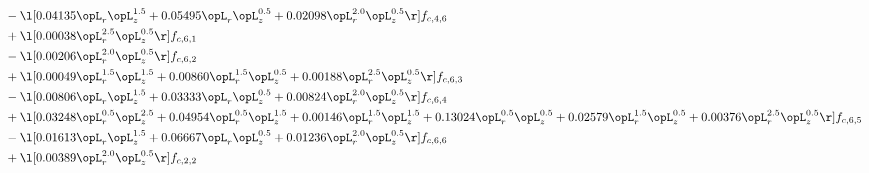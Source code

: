 \begin{alignat}{2}
& - \l[  0.04135 \opL_r \opL_z^{1.5} +  0.05495 \opL_r \opL_z^{0.5} +  0.02098 \opL_r^{2.0} \opL_z^{0.5}  \r] f_{c,4,6} \nonumber \\ 
& + \l[  0.00038 \opL_r^{2.5} \opL_z^{0.5}  \r] f_{c,6,1} \nonumber \\ 
& - \l[  0.00206 \opL_r^{2.0} \opL_z^{0.5}  \r] f_{c,6,2} \nonumber \\ 
& + \l[  0.00049 \opL_r^{1.5} \opL_z^{1.5} +  0.00860 \opL_r^{1.5} \opL_z^{0.5} +  0.00188 \opL_r^{2.5} \opL_z^{0.5}  \r] f_{c,6,3} \nonumber \\ 
& - \l[  0.00806 \opL_r \opL_z^{1.5} +  0.03333 \opL_r \opL_z^{0.5} +  0.00824 \opL_r^{2.0} \opL_z^{0.5}  \r] f_{c,6,4} \nonumber \\ 
& + \l[  0.03248 \opL_r^{0.5} \opL_z^{2.5} +  0.04954 \opL_r^{0.5} \opL_z^{1.5} +  0.00146 \opL_r^{1.5} \opL_z^{1.5} +  0.13024 \opL_r^{0.5} \opL_z^{0.5} +  0.02579 \opL_r^{1.5} \opL_z^{0.5} +  0.00376 \opL_r^{2.5} \opL_z^{0.5}  \r] f_{c,6,5} \nonumber \\ 
& - \l[  0.01613 \opL_r \opL_z^{1.5} +  0.06667 \opL_r \opL_z^{0.5} +  0.01236 \opL_r^{2.0} \opL_z^{0.5}  \r] f_{c,6,6} \nonumber \\ 
& + \l[  0.00389 \opL_r^{2.0} \opL_z^{0.5}  \r] f_{c,2,2} \nonumber \\ 
\end{alignat} 



